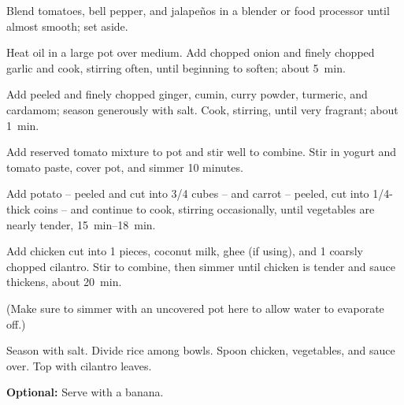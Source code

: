 \begin{recipe}
{		\step Blend tomatoes, bell pepper, and jalapeños in a blender or food processor until almost smooth; set aside.
		
		\step Heat oil in a large pot over medium. Add chopped onion and finely chopped garlic and cook, stirring often, until beginning to soften; about \SI{5}{\minute}. 
		
		\step Add peeled and finely chopped ginger, cumin, curry powder, turmeric, and cardamom; season generously with salt. Cook, stirring, until very fragrant; about \SI{1}{\minute}. 
		
		\step Add reserved tomato mixture to pot and stir well to combine. Stir in yogurt and tomato paste, cover pot, and simmer 10 minutes. 
		
		\step Add potato -- peeled and cut into \SI{3/4}{\inch} cubes -- and carrot -- peeled, cut into \SI{1/4}{\inch}-thick coins -- and continue to cook, stirring occasionally, until vegetables are nearly tender, \SIrange{15}{18}{\minute}.

		\step Add chicken cut into \SI{1}{\inch} pieces, coconut milk, ghee (if using), and \SI{1}{\cup} coarsly chopped cilantro. Stir to combine, then simmer until chicken is tender and sauce thickens, about \SI{20}{\minute}. 
		
		(Make sure to simmer with an uncovered pot here to allow water to evaporate off.) 
		
		\step Season with salt. Divide rice among bowls. Spoon chicken, vegetables, and sauce over. Top with cilantro leaves.
		
		\textbf{Optional:} Serve with a banana.
	}
    
\end{recipe}